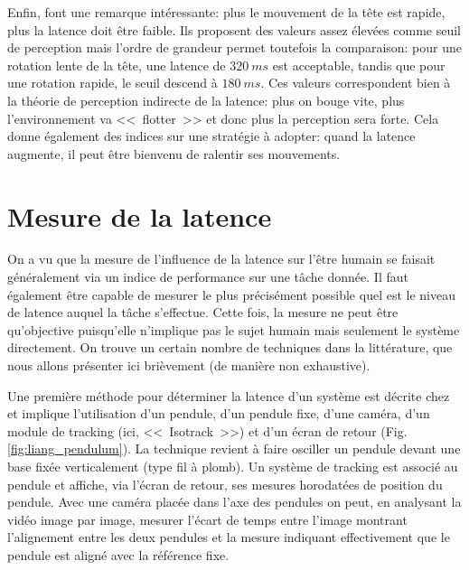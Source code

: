 	\par Enfin, \citep{allison_tolerance_2001} font une remarque intéressante: plus le mouvement de la tête est rapide, plus la latence doit être faible. Ils proposent des valeurs assez élevées comme seuil de perception mais l'ordre de grandeur permet toutefois la comparaison: pour une rotation lente de la tête, une latence de $320~ms$ est acceptable, tandis que pour une rotation rapide, le seuil descend à $180~ms$. Ces valeurs correspondent bien à la théorie de perception indirecte de la latence: plus on bouge vite, plus l'environnement va <<~flotter~>> et donc plus la perception sera forte. Cela donne également des indices sur une stratégie à adopter: quand la latence augmente, il peut être bienvenu de ralentir ses mouvements.
	
	\section{Mesure de la latence}
	\par On a vu que la mesure de l'influence de la latence sur l'être humain se faisait généralement via un indice de performance sur une tâche donnée. Il faut également être capable de mesurer le plus précisément possible quel est le niveau de latence auquel la tâche s'effectue. Cette fois, la mesure ne peut être qu'objective puisqu'elle n'implique pas le sujet humain mais seulement le système directement. On trouve un certain nombre de techniques dans la littérature, que nous allons présenter ici brièvement (de manière non exhaustive).
	
	\par Une première méthode pour déterminer la latence d'un système est décrite chez  \citep{liang_temporal-spatial_1991} et implique l'utilisation d'un pendule, d'un pendule fixe, d'une caméra, d'un module de tracking (ici, <<~Isotrack~>>) et d'un écran de retour (Fig. \ref{fig:liang_pendulum}). La technique revient à faire osciller un pendule devant une base fixée verticalement (type fil à plomb). Un système de tracking est associé au pendule et affiche, via l'écran de retour, ses mesures horodatées de position du pendule. Avec une caméra placée dans l'axe des pendules on peut, en analysant la vidéo image par image, mesurer l'écart de temps entre l'image montrant l'alignement entre les deux pendules et la mesure indiquant effectivement que le pendule est aligné avec la référence fixe.
	
